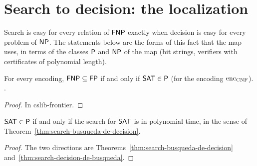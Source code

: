 \section{Search to decision: the localization}
\label{sec:search-localization}

Search is easy for every relation of $\mathsf{FNP}$ exactly when decision is easy for every problem of
$\mathsf{NP}$. The statements below are the forms of this fact that the map uses, in terms of the
classes $\mathsf{P}$ and $\mathsf{NP}$ of the map (bit strings, verifiers with certificates of polynomial
length).

\begin{theorem}
  \label{thm:search-cslib-fnp-sat}
  \leanok
  For every encoding, $\mathsf{FNP} \subseteq \mathsf{FP}$ if and only if $\mathsf{SAT} \in \mathsf{P}$ (for the encoding
  $\mathrm{enc}_{\mathrm{CNF}}$).
  .
\end{theorem}

\begin{proof}
  \leanok
  In cslib-frontier.
\end{proof}

\begin{theorem}
  \label{thm:search-sat-iff-busqueda}
  \leanok
  $\mathsf{SAT} \in \mathsf{P}$ if and only if the search for $\mathsf{SAT}$ is in polynomial time, in the sense of
  Theorem~\ref{thm:search-busqueda-de-decision}.
\end{theorem}

\begin{proof}
  \leanok
  The two directions are Theorems~\ref{thm:search-busqueda-de-decision}
  and~\ref{thm:search-decision-de-busqueda}.
\end{proof}

